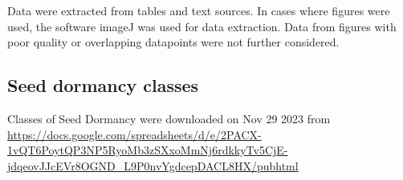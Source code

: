 \documentclass{article}
\begin{document}
Data were extracted from tables and text sources. In cases where figures were used, the software imageJ  was used for data extraction. Data from figures with poor quality or overlapping datapoints were not further considered.

\subsection*{Seed dormancy classes} 

Classes of Seed Dormancy were downloaded on Nov 29 2023 from \url{https://docs.google.com/spreadsheets/d/e/2PACX-1vQT6PoytQP3NP5RyoMb3zSXxoMmNj6rdkkyTv5CjE-jdqeovJJcEVr8OGND_L9P0nvYgdcepDACL8HX/pubhtml}




%
\end{document}
